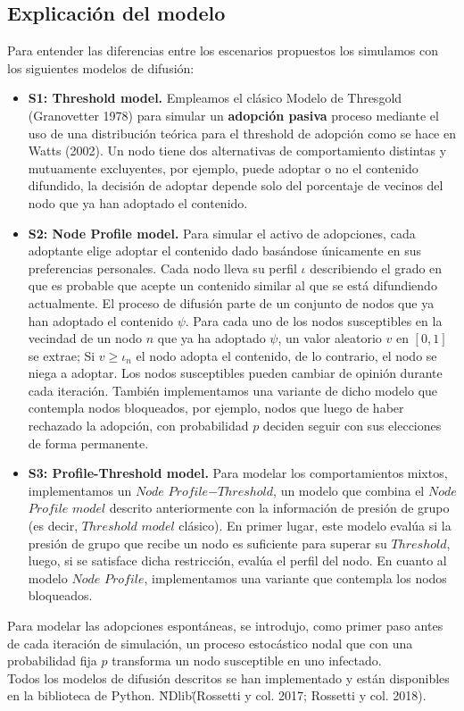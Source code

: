 \documentclass{article}
\begin{document}
\subsection{Explicación del modelo}
Para entender las diferencias entre los escenarios propuestos los simulamos con los siguientes modelos de difusión:
\begin{itemize}
 \item \textbf{S1: Threshold model.} Empleamos el clásico Modelo de Thresgold (Granovetter 1978) para simular un \textbf{adopción pasiva} proceso mediante el uso de una distribución teórica para el threshold de adopción como se hace en Watts (2002). Un nodo tiene dos alternativas de comportamiento distintas y mutuamente excluyentes, por ejemplo, puede adoptar o no el contenido difundido, la decisión de adoptar depende solo del porcentaje de vecinos del nodo que ya han adoptado el contenido.
 \item \textbf{S2: Node Profile model.}
Para simular el activo de adopciones, cada adoptante elige adoptar el contenido dado basándose únicamente en sus preferencias personales. Cada nodo lleva su perfil $\iota$ describiendo el grado en que es probable que acepte un contenido similar al que se está difundiendo actualmente. El proceso de difusión parte de un conjunto de nodos que ya han adoptado el contenido $\psi$. Para cada uno de los nodos susceptibles en la vecindad de un nodo $n$ que ya ha adoptado $\psi$, un valor aleatorio $v$ en $[0,1]$ se extrae; Si $v \geq \iota_n$ el nodo adopta el contenido, de lo contrario, el nodo se niega a adoptar. Los nodos susceptibles pueden cambiar de opinión durante cada iteración. También implementamos una variante de dicho modelo que contempla nodos bloqueados, por ejemplo, nodos que luego de haber rechazado la adopción, con probabilidad $p$ deciden seguir con sus elecciones de forma permanente. 
 \item \textbf{S3: Profile-Threshold model.}
Para modelar los comportamientos mixtos, implementamos un $Node$ $Profile$$-$$Threshold$, un modelo que combina el $Node$ $Profile$ $model$ descrito anteriormente con la información de presión de grupo (es decir, $Threshold$ $model$ clásico). En primer lugar, este modelo evalúa si la presión de grupo que recibe un nodo es suficiente para superar su $Threshold$, luego, si se satisface dicha restricción, evalúa el perfil del nodo. En cuanto al modelo $Node$ $Profile$, implementamos una variante que contempla los nodos bloqueados. 
\end{itemize}
Para modelar las adopciones espontáneas, se introdujo, como primer paso antes de cada iteración de simulación, un proceso estocástico nodal que con una probabilidad fija $p$ transforma un nodo susceptible en uno infectado.
\\
Todos los modelos de difusión descritos se han implementado y están disponibles en la biblioteca de Python. \"NDlib\" (Rossetti y col. 2017; Rossetti y col. 2018).
\end{document}
